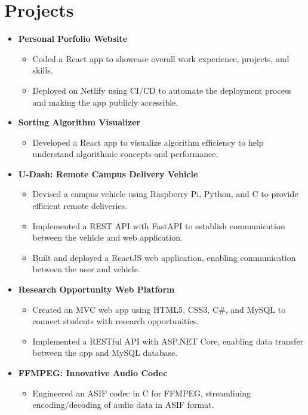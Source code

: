 \documentclass[letterpaper,11pt]{article}
\begin{document}

\section{\textbf{Projects}}
\begin{itemize}[leftmargin=0.05in, label={}]
	\item{
	            \textbf{Personal Porfolio Website}
	            \begin{itemize} [label=$\bullet$]
		            \item{Coded a React app to showcase overall work experience, projects, and skills.}
		            \item {Deployed on Netlify using CI/CD to automate the deployment process and making the app publicly accessible.}
	            \end{itemize}
	      }
	\item{
	            \textbf{Sorting Algorithm Visualizer}
	            \begin{itemize} [label=$\bullet$]
		            \item{Developed a React app to visualize algorithm efficiency to help understand algorithmic concepts and performance.}
	            \end{itemize}
	      }
	\item{
	            \textbf{U-Dash: Remote Campus Delivery Vehicle}
	            \begin{itemize} [label=$\bullet$]
		            \item{Devised a campus vehicle using Raspberry Pi, Python, and C to provide efficient remote deliveries.}
		            \item {Implemented a REST API with FastAPI to establish  communication between the vehicle and web application.}
		            \item{Built and deployed a ReactJS web application, enabling communication between the user and vehicle.}

	            \end{itemize}
	      }
	\item{
	            \textbf{Research Opportunity Web Platform}
	            \begin{itemize} [label=$\bullet$]
		            \item{Created an MVC web app using HTML5, CSS3, C\#, and MySQL to connect students with research opportunities.}
		            \item{Implemented a RESTful API with ASP.NET Core, enabling data transfer between the app and MySQL database.}
	            \end{itemize}
	      }
	\item{
	            \textbf{FFMPEG: Innovative Audio Codec}
	            \begin{itemize} [label=$\bullet$]
		            \item{Engineered an ASIF codec in C for FFMPEG, streamlining encoding/decoding of audio data in ASIF format.}
	            \end{itemize}
	      }

\end{itemize}
\end{document}
